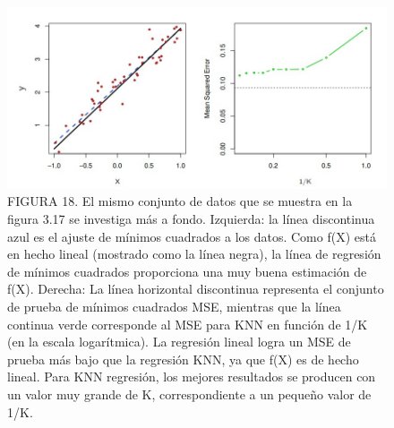 \documentclass[
  letterpaper,
  DIV=11,
  numbers=noendperiod]{scrartcl}
\begin{document}
\begin{figure}

{\centering \includegraphics{images/le.jpg}

}

\caption{FIGURA 18. El mismo conjunto de datos que se muestra en la
figura 3.17 se investiga más a fondo. Izquierda: la línea discontinua
azul es el ajuste de mínimos cuadrados a los datos. Como f(X) está en
hecho lineal (mostrado como la línea negra), la línea de regresión de
mínimos cuadrados proporciona una muy buena estimación de f(X). Derecha:
La línea horizontal discontinua representa el conjunto de prueba de
mínimos cuadrados MSE, mientras que la línea continua verde corresponde
al MSE para KNN en función de 1/K (en la escala logarítmica). La
regresión lineal logra un MSE de prueba más bajo que la regresión KNN,
ya que f(X) es de hecho lineal. Para KNN regresión, los mejores
resultados se producen con un valor muy grande de K, correspondiente a
un pequeño valor de 1/K.}

\end{figure}
\end{document}

